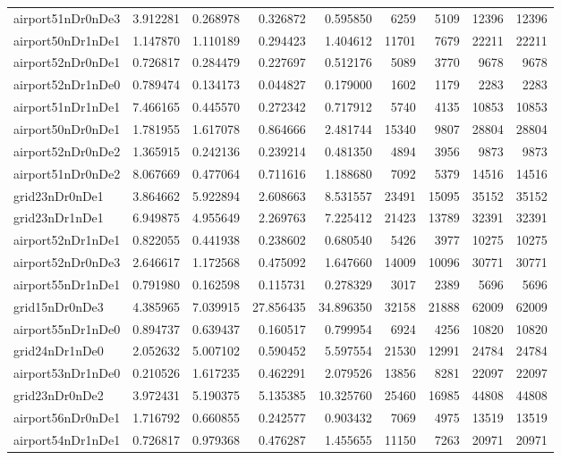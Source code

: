 \begin{longtable}{|l|r|r|r|r|r|r|r|r|}
airport51nDr0nDe3 & 3.912281 & 0.268978 & 0.326872 & 0.595850 & 6259 & 5109 & 12396 & 12396 \\
airport50nDr1nDe1 & 1.147870 & 1.110189 & 0.294423 & 1.404612 & 11701 & 7679 & 22211 & 22211 \\
airport52nDr0nDe1 & 0.726817 & 0.284479 & 0.227697 & 0.512176 & 5089 & 3770 & 9678 & 9678 \\
airport52nDr1nDe0 & 0.789474 & 0.134173 & 0.044827 & 0.179000 & 1602 & 1179 & 2283 & 2283 \\
airport51nDr1nDe1 & 7.466165 & 0.445570 & 0.272342 & 0.717912 & 5740 & 4135 & 10853 & 10853 \\
airport50nDr0nDe1 & 1.781955 & 1.617078 & 0.864666 & 2.481744 & 15340 & 9807 & 28804 & 28804 \\
airport52nDr0nDe2 & 1.365915 & 0.242136 & 0.239214 & 0.481350 & 4894 & 3956 & 9873 & 9873 \\
airport51nDr0nDe2 & 8.067669 & 0.477064 & 0.711616 & 1.188680 & 7092 & 5379 & 14516 & 14516 \\
grid23nDr0nDe1 & 3.864662 & 5.922894 & 2.608663 & 8.531557 & 23491 & 15095 & 35152 & 35152 \\
grid23nDr1nDe1 & 6.949875 & 4.955649 & 2.269763 & 7.225412 & 21423 & 13789 & 32391 & 32391 \\
airport52nDr1nDe1 & 0.822055 & 0.441938 & 0.238602 & 0.680540 & 5426 & 3977 & 10275 & 10275 \\
airport52nDr0nDe3 & 2.646617 & 1.172568 & 0.475092 & 1.647660 & 14009 & 10096 & 30771 & 30771 \\
airport55nDr1nDe1 & 0.791980 & 0.162598 & 0.115731 & 0.278329 & 3017 & 2389 & 5696 & 5696 \\
grid15nDr0nDe3 & 4.385965 & 7.039915 & 27.856435 & 34.896350 & 32158 & 21888 & 62009 & 62009 \\
airport55nDr1nDe0 & 0.894737 & 0.639437 & 0.160517 & 0.799954 & 6924 & 4256 & 10820 & 10820 \\
grid24nDr1nDe0 & 2.052632 & 5.007102 & 0.590452 & 5.597554 & 21530 & 12991 & 24784 & 24784 \\
airport53nDr1nDe0 & 0.210526 & 1.617235 & 0.462291 & 2.079526 & 13856 & 8281 & 22097 & 22097 \\
grid23nDr0nDe2 & 3.972431 & 5.190375 & 5.135385 & 10.325760 & 25460 & 16985 & 44808 & 44808 \\
airport56nDr0nDe1 & 1.716792 & 0.660855 & 0.242577 & 0.903432 & 7069 & 4975 & 13519 & 13519 \\
airport54nDr1nDe1 & 0.726817 & 0.979368 & 0.476287 & 1.455655 & 11150 & 7263 & 20971 & 20971 \\

\end{longtable}
